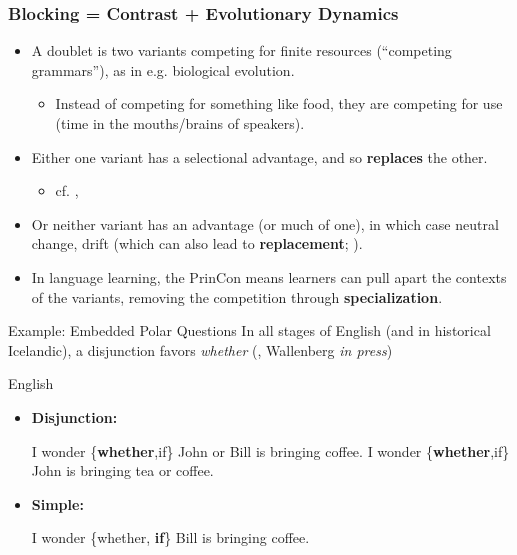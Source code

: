 \documentclass[hyperref={pdfpagelabels=false}]{beamer}
\begin{document}
\begin{frame}
\frametitle{Blocking = Contrast + Evolutionary Dynamics}
\begin{itemize}
	\item A doublet is two variants competing for finite resources (``competing grammars''), as in e.g. biological evolution.
		\begin{itemize} 
			\item Instead of competing for something like food, they are competing for use (time in the mouths/brains of speakers). 
			

			\end{itemize}
	\item Either one variant has a selectional advantage, and so \textbf{replaces} the other. 	
	\begin{itemize} \item \small{cf. \citet[][and subs.]{yang2000, yang2002}, \citet{heycockwallenberg2013}}

			\end{itemize}
	\item Or neither variant has an advantage (or much of one), in which case neutral change, drift (which can also lead to \textbf{replacement}; \citealt{kauhanen2016}).
	

	\item In language learning, the PrinCon means learners can pull apart the contexts of the variants, removing the competition through \textbf{specialization}.
\end{itemize}
\end{frame}


\begin{frame}{Example: Embedded Polar Questions}
		In all stages of English (and in historical Icelandic), a disjunction favors {\it whether} (\citealt{baileywallenbergwurff2012, wallenberg2016}, Wallenberg \textsl{in press})
	\begin{block}{English}
		\begin{itemize}
		\item[ ]\textbf{Disjunction:}
		\begin{exe}
			\ex I wonder \{{\bf whether},if\} John or Bill is bringing coffee.
			\ex I wonder \{{\bf whether},if\} John is bringing tea or coffee.
		\end{exe}
		\item[ ]\textbf{Simple:}
		\begin{exe}
			\ex I wonder \{whether, {\bf if}\} Bill is bringing coffee.
		\end{exe}
		\end{itemize}
	
	\end{block}
\end{frame}
\end{document}
